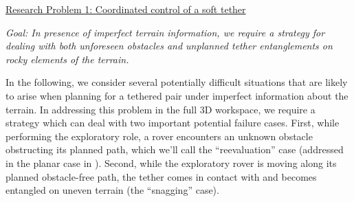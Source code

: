 \documentclass[12pt]{article}
\begin{document}

\noindent\underline{Research Problem 1: Coordinated control of a soft tether}

{\sl Goal: In presence of imperfect terrain information, we require a strategy for dealing with both 
unforeseen obstacles and unplanned tether entanglements on rocky elements of the terrain. }

In the following, we consider several potentially difficult situations that are likely 
to arise when planning for a tethered pair under imperfect information about the terrain. In 
addressing this problem in the full 3D workspace, we 
require a strategy which can deal with two important potential failure cases. First, while performing the exploratory role, a rover 
encounters an unknown obstacle obstructing its planned path, which we'll call the 
``reevaluation'' case (addressed in the planar case in \cite{axel_online}).
Second, while the exploratory rover is moving along its planned obstacle-free path, the tether comes in contact with and 
becomes entangled on uneven terrain (the ``snagging'' case).
\end{document}
